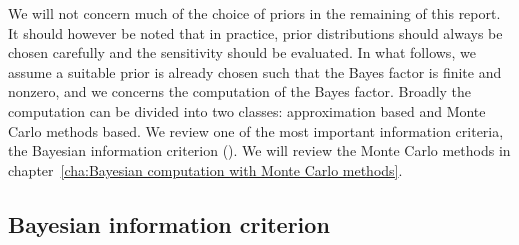 We will not concern much of the choice of priors in the remaining of this
report. It should however be noted that in practice, prior distributions
should always be chosen carefully and the sensitivity should be evaluated. In
what follows, we assume a suitable prior is already chosen such that the Bayes
factor is finite and nonzero, and we concerns the computation of the Bayes
factor. Broadly the computation can be divided into two classes: approximation
based and Monte Carlo methods based. We review one of the most important
information criteria, the Bayesian information criterion (\bic). We will
review the Monte Carlo methods in chapter~\ref{cha:Bayesian computation with
  Monte Carlo methods}.

\subsection{Bayesian information criterion}
\label{sub:Bayesian information criterion}

